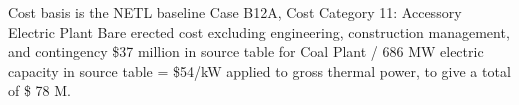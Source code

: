 Cost basis is the NETL baseline Case B12A, Cost Category 11: Accessory Electric Plant Bare erected cost excluding engineering, construction management, and contingency \$37 million in source table for Coal Plant / 686 MW electric capacity in source table = \$54/kW applied to gross  thermal power, to give a total of \$ 78 M.